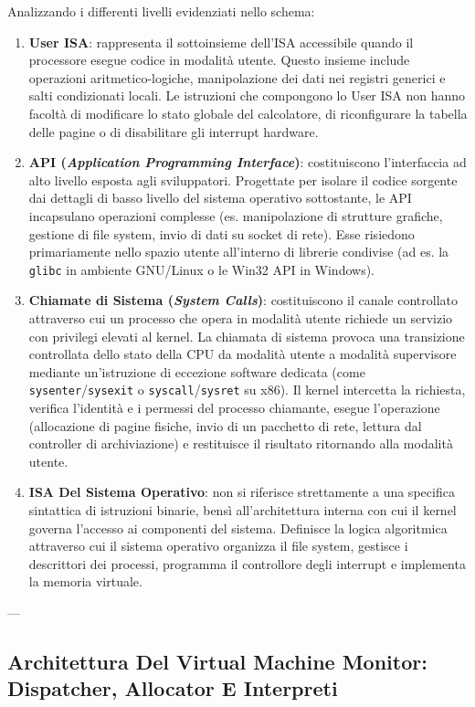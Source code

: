 \documentclass[11pt, a4paper]{article}
\begin{document}
Analizzando i differenti livelli evidenziati nello schema:
\begin{enumerate}
    \item \textbf{User ISA}: rappresenta il sottoinsieme dell'ISA accessibile quando il processore esegue codice in modalità utente. Questo insieme include operazioni aritmetico-logiche, manipolazione dei dati nei registri generici e salti condizionati locali. Le istruzioni che compongono lo User ISA non hanno facoltà di modificare lo stato globale del calcolatore, di riconfigurare la tabella delle pagine o di disabilitare gli interrupt hardware.
    \item \textbf{API (\emph{Application Programming Interface})}: costituiscono l'interfaccia ad alto livello esposta agli sviluppatori. Progettate per isolare il codice sorgente dai dettagli di basso livello del sistema operativo sottostante, le API incapsulano operazioni complesse (es. manipolazione di strutture grafiche, gestione di file system, invio di dati su socket di rete). Esse risiedono primariamente nello spazio utente all'interno di librerie condivise (ad es. la \texttt{glibc} in ambiente GNU/Linux o le Win32 API in Windows).
    \item \textbf{Chiamate di Sistema (\emph{System Calls})}: costituiscono il canale controllato attraverso cui un processo che opera in modalità utente richiede un servizio con privilegi elevati al kernel. La chiamata di sistema provoca una transizione controllata dello stato della CPU da modalità utente a modalità supervisore mediante un'istruzione di eccezione software dedicata (come \texttt{sysenter}/\texttt{sysexit} o \texttt{syscall}/\texttt{sysret} su x86). Il kernel intercetta la richiesta, verifica l'identità e i permessi del processo chiamante, esegue l'operazione (allocazione di pagine fisiche, invio di un pacchetto di rete, lettura dal controller di archiviazione) e restituisce il risultato ritornando alla modalità utente.
    \item \textbf{ISA Del Sistema Operativo}: non si riferisce strettamente a una specifica sintattica di istruzioni binarie, bensì all'architettura interna con cui il kernel governa l'accesso ai componenti del sistema. Definisce la logica algoritmica attraverso cui il sistema operativo organizza il file system, gestisce i descrittori dei processi, programma il controllore degli interrupt e implementa la memoria virtuale.
\end{enumerate}

---

\subsection{Architettura Del Virtual Machine Monitor: Dispatcher, Allocator E Interpreti}
\end{document}
